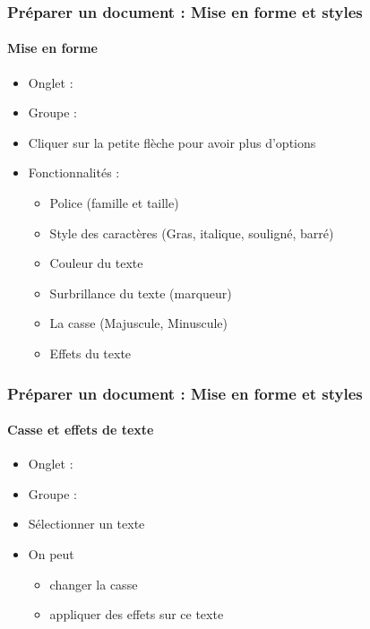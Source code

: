 \documentclass[xcolor=table]{beamer}
\begin{document}
\begin{frame}
\frametitle{Préparer un document : Mise en forme et styles}
\framesubtitle{Mise en forme}

\begin{minipage}{0.48\textwidth}
\begin{itemize}
	\item Onglet : 
	\item Groupe : 
	\item Cliquer sur la petite flèche pour avoir plus d'options
	\item Fonctionnalités :
	\begin{itemize}
		\item Police (famille et taille) 
		\item Style des caractères (Gras, italique, souligné, barré) 
		\item Couleur du texte
		\item Surbrillance du texte (marqueur)
		\item La casse (Majuscule, Minuscule)
		\item Effets du texte
	\end{itemize}
\end{itemize}
\end{minipage}
\begin{minipage}{0.50\textwidth}
	
\end{minipage}

\end{frame}

\begin{frame}
\frametitle{Préparer un document : Mise en forme et styles}
\framesubtitle{Casse et effets de texte}

\begin{minipage}{0.58\textwidth}
\begin{itemize}
	\item Onglet : 
	\item Groupe : 
	\item Sélectionner un texte
	\item On peut
	\begin{itemize}
		\item changer la casse 
		\item appliquer des effets sur ce texte
	\end{itemize}
\end{itemize}
\end{minipage}
\begin{minipage}{0.4\textwidth}
	
\end{minipage}

\end{frame}
\end{document}
